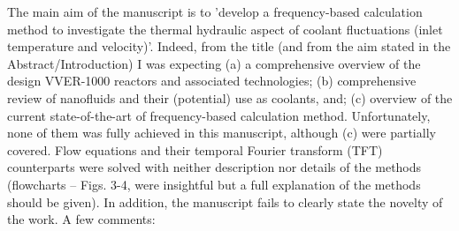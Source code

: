 \documentclass[14pt,twoside]{report}
\begin{document}
The main aim of the manuscript is to 'develop a frequency-based calculation method to investigate the thermal hydraulic aspect of coolant fluctuations (inlet temperature and velocity)'. Indeed, from the title (and from the aim stated in the Abstract/Introduction) I was expecting (a) a comprehensive overview of the design VVER-1000 reactors and associated technologies; (b) comprehensive review of nanofluids and their (potential) use as coolants, and; (c) overview of the current state-of-the-art of frequency-based calculation method. Unfortunately, none of them was fully achieved in this manuscript, although (c) were partially covered. Flow equations and their temporal Fourier transform (TFT) counterparts were solved with neither description nor details of the methods (flowcharts -- Figs. 3-4, were insightful but a full explanation of the methods should be given). In addition, the manuscript fails to clearly state the novelty of the work. A few comments:
\end{document}

